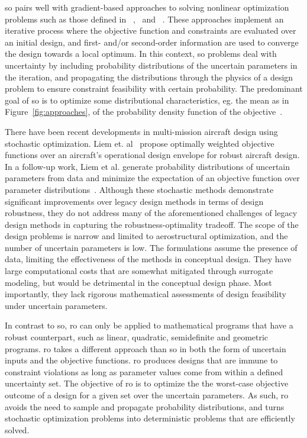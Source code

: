 {{\color{blue}\gls{so} pairs well with gradient-based approaches to solving nonlinear optimization problems
such as those defined in ~\cite{Gallard2013},~\cite{Liem2015} and ~\cite{Liem2017}.
These approaches implement an iterative process where
the objective function and constraints are evaluated over an initial design, and first- and/or
second-order information are used to converge the design towards a local optimum.
In this context, \gls{so} problems deal with uncertainty by including
probability distributions of the uncertain parameters in the iteration, and propagating
the distributions through the physics of a design problem to ensure constraint feasibility with certain probability.
The predominant goal of \gls{so} is to optimize some distributional
characteristics, eg. the mean as in Figure~\ref{fig:approaches},
of the probability density function of the objective~\cite{Diwekar2008}.}

{\color{blue}There have been recent developments in multi-mission aircraft design
using stochastic optimization.
Liem et. al~\cite{Liem2015} propose optimally
weighted objective functions over an aircraft's operational
design envelope for robust aircraft design.
In a follow-up work, Liem et al. generate probability distributions
of uncertain parameters from data
and minimize the expectation of an objective function over
parameter distributions~\cite{Liem2017}.
Although these stochastic methods demonstrate significant improvements over
legacy design methods in terms of design robustness,
they do not address many of the aforementioned challenges of legacy design methods
in capturing the robustness-optimality tradeoff.
The scope of the design problems is narrow and limited to aerostructural optimization,
and the number of uncertain parameters is low.
The formulations assume the presence of data, limiting the
effectiveness of the methods in conceptual design.
They have large computational costs that are somewhat mitigated through
surrogate modeling, but would be detrimental in the conceptual design phase.
Most importantly, they lack rigorous mathematical assessments of design feasibility
under uncertain parameters.}

In contrast to \gls{so},
\gls{ro} can only be applied to mathematical programs that have a robust counterpart,
such as linear, quadratic, semidefinite and geometric programs.
\gls{ro} takes a different approach than \gls{so} in both the form
of uncertain inputs and the objective functions. \gls{ro} produces designs that are
immune to constraint violations as long as parameter values come from within a defined
uncertainty set. The objective of \gls{ro} is to optimize the
the worst-case objective outcome of a design for a
given set over the uncertain parameters. As such,
\gls{ro} avoids the need to sample and propagate probability
distributions, and turns stochastic optimization problems into
deterministic problems that are efficiently solved.}

